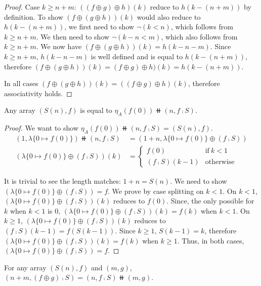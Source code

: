 \begin{proof}
Case $k \geq n + m$: $((f \oplus g) \oplus h)(k)$ reduce to $h(k - (n + m))$ by definition.
To show $(f \oplus (g \oplus h))(k)$ would also reduce to $h(k - (n + m))$,
we first need to show $\neg(k < n)$, which follows from $k \geq n + m$.
We then need to show $\neg(k - n < m)$, which also follows from $k \geq n + m$.
We now have $(f \oplus (g \oplus h))(k) = h(k - n - m)$. Since $k \geq n + m$, $h(k - n - m)$ is well defined
and is equal to $h(k - (n + m))$, therefore $(f \oplus (g \oplus h))(k) = (f \oplus g) \oplus h)(k) = h(k - (n + m))$.

In all cases $(f \oplus (g \oplus h))(k) = ((f \oplus g) \oplus h)(k)$, therefore associativity holds.
\end{proof}

\begin{lemma}\label{array:eta-suc}
Any array $(S(n), f)$ is equal to $\eta_A (f(0)) \doubleplus (n, f \comp S)$.
\end{lemma}

\begin{proof}
We want to show $\eta_A (f(0)) \doubleplus (n, f \comp S) = (S(n), f)$.
\begin{align*}
    (1, \lambda\{ 0 \mapsto f(0) \}) \doubleplus (n , f \comp S) &
    = (1 + n, \lambda\{ 0 \mapsto f(0) \} \oplus (f \comp S)) \\
    (\lambda\{ 0 \mapsto f(0) \} \oplus (f \comp S))(k) & = \begin{cases}
      f(0) & \text{if}\ k < 1 \\
      (f \comp S)(k - 1) & \text{otherwise}
    \end{cases}
\end{align*} 

It is trivial to see the length matches: $1 + n = S(n)$. We need to show 
$(\lambda\{ 0 \mapsto f(0) \} \oplus (f \comp S)) = f$.
We prove by case splitting on $k < 1$.
On $k < 1$, $(\lambda\{ 0 \mapsto f(0) \} \oplus (f \comp S))(k)$ reduces to $f(0)$.
Since, the only possible for $k$ when $k < 1$ is 0, $(\lambda\{ 0 \mapsto f(0) \} \oplus (f \comp S))(k) = f(k)$
when $k < 1$.
On $k \geq 1$, $(\lambda\{ 0 \mapsto f(0) \} \oplus (f \comp S))(k)$ reduces to $(f \comp S)(k - 1) = f(S(k - 1))$.
Since $k \geq 1$, $S(k - 1) = k$, therefore $(\lambda\{ 0 \mapsto f(0) \} \oplus (f \comp S))(k) = f(k)$
when $k \geq 1$.
Thus, in both cases, $(\lambda\{ 0 \mapsto f(0) \} \oplus (f \comp S)) = f$.
\end{proof}

\begin{lemma}\label{array:split}
For any array $(S(n), f)$ and $(m, g)$, $(n + m, (f \oplus g) \comp S) = (n, f \comp S) \doubleplus (m, g)$.
\end{lemma}

